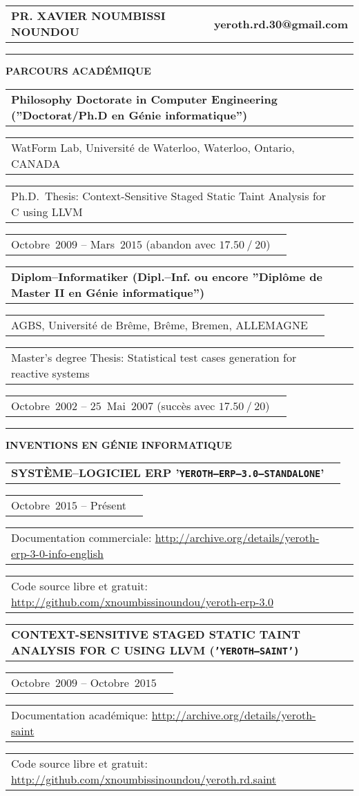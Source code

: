 \documentclass[9pt,a4paper]{article} %
\makeatletter
\newcommand{\headerrow}[2]
{\begin{tabular*}{\linewidth}{l@{\extracolsep{\fill}}r}
	#1 &
	#2 \\
\end{tabular*}}
\newcommand{\headerrowONE}[1]{\headerrow{#1}{}}
\newcommand{\cvitemdate}[2]{#1~$#2$\xspace}
\makeatother
\begin{document}
\bigskip


\headerrow
	{\Large \textbf{PR. XAVIER NOUMBISSI NOUNDOU}}	
	{\large \textbf{yeroth.rd.30@gmail.com}}

\vspace{1em}


\hrule
\begin{center}
{\large \textbf{PARCOURS ACADÉMIQUE}}
\end{center}

\vspace{0.5em}

\headerrowONE{\textbf{Philosophy Doctorate in Computer Engineering (''Doctorat/Ph.D en Génie informatique'')}}	
\headerrowONE{WatForm Lab, Université de Waterloo, Waterloo, Ontario, CANADA}
\headerrowONE{Ph.D.~Thesis: Context-Sensitive Staged Static Taint Analysis for C using LLVM}
\headerrowONE{\cvitemdate{Octobre}{2009} -- \cvitemdate{Mars}{2015} (abandon avec $17.50~/~20$)}	
	
\vspace{0.3em}
	
\headerrowONE{\textbf{Diplom--Informatiker (Dipl.--Inf. ou encore ''Diplôme de Master II en Génie informatique'')}}	
\headerrowONE{AGBS, Université de Brême, Brême, Bremen, ALLEMAGNE}
\headerrowONE{Master's degree Thesis: Statistical test cases generation for reactive systems}
\headerrowONE{\cvitemdate{Octobre}{2002} -- \cvitemdate{$25$~Mai}{2007} (succès avec $17.50~/~20$)}	

\vspace{1em}

\hrule
\begin{center}
{\large \textbf{INVENTIONS EN GÉNIE INFORMATIQUE}}
\end{center}

\vspace{0.5em}

\headerrowONE{\textbf{SYSTÈME--LOGICIEL ERP '\texttt{YEROTH--ERP--3.0--STANDALONE}'}}	
\headerrowONE{\cvitemdate{Octobre}{2015} -- Présent}	
\headerrowONE{Documentation commerciale: \url{http://archive.org/details/yeroth-erp-3-0-info-english}}
\headerrowONE{Code source libre et gratuit: \url{http://github.com/xnoumbissinoundou/yeroth-erp-3.0}}

\vspace{0.3em}

\headerrowONE{\textbf{CONTEXT-SENSITIVE STAGED STATIC TAINT ANALYSIS FOR C USING LLVM (\texttt{'YEROTH--SAINT')}}}
\headerrowONE{\cvitemdate{Octobre}{2009} -- \cvitemdate{Octobre}{2015}}	
\headerrowONE{Documentation académique: \url{http://archive.org/details/yeroth-saint}}
\headerrowONE{Code source libre et gratuit: \url{http://github.com/xnoumbissinoundou/yeroth.rd.saint}}
	
\end{document}
